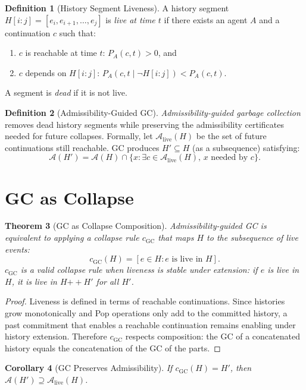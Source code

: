 \documentclass[12pt, a4paper, openany]{book}
\theoremstyle{plain}
\newtheorem{theorem}{Theorem}[chapter]
\newtheorem{corollary}[theorem]{Corollary}
\theoremstyle{definition}
\newtheorem{definition}[theorem]{Definition}
\theoremstyle{remark}
\newcommand{\calA}{\mathcal{A}}
\begin{document}
\begin{definition}[History Segment Liveness]
A history segment $H[i:j] = [e_i, e_{i+1}, \ldots, e_j]$ is \emph{live at
time $t$} if there exists an agent $A$ and a continuation $c$ such that:
\begin{enumerate}
\item $c$ is reachable at time $t$: $P_A(c, t) > 0$, and
\item $c$ depends on $H[i:j]$: $P_A(c, t \mid \neg H[i:j]) < P_A(c, t)$.
\end{enumerate}
A segment is \emph{dead} if it is not live.
\end{definition}

\begin{definition}[Admissibility-Guided GC]
\emph{Admissibility-guided garbage collection} removes dead history segments
while preserving the admissibility certificates needed for future collapses.
Formally, let $\calA_{\mathrm{live}}(H)$ be the set of future continuations
still reachable. GC produces $H' \subseteq H$ (as a subsequence) satisfying:
\[
\calA(H') = \calA(H) \cap \{x : \exists c \in \calA_{\mathrm{live}}(H),\, x \text{ needed by } c\}.
\]
\end{definition}

\section{GC as Collapse}

\begin{theorem}[GC as Collapse Composition]
Admissibility-guided GC is equivalent to applying a collapse rule $c_{\mathrm{GC}}$
that maps $H$ to the subsequence of live events:
\[
c_{\mathrm{GC}}(H) = [e \in H : e \text{ is live in } H].
\]
$c_{\mathrm{GC}}$ is a valid collapse rule when liveness is stable under
extension: if $e$ is live in $H$, it is live in $H \mathbin{++} H'$ for all $H'$.
\end{theorem}

\begin{proof}
Liveness is defined in terms of reachable continuations. Since histories grow
monotonically and Pop operations only add to the committed history, a past
commitment that enables a reachable continuation remains enabling under history
extension. Therefore $c_{\mathrm{GC}}$ respects composition: the GC of a
concatenated history equals the concatenation of the GC of the parts.
\end{proof}

\begin{corollary}[GC Preserves Admissibility]
If $c_{\mathrm{GC}}(H) = H'$, then $\calA(H') \supseteq \calA_{\mathrm{live}}(H)$.
\end{corollary}
\end{document}
